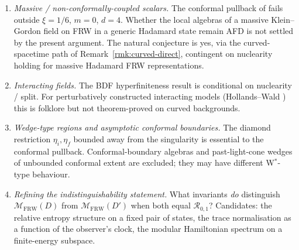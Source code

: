 \documentclass[11pt]{article}
\theoremstyle{definition}
\newcommand{\MM}{\mathcal{M}}
\newcommand{\RR}{\mathcal{R}}
\newcommand{\FRW}{\mathrm{FRW}}
\begin{document}
\begin{enumerate}
\item \emph{Massive / non-conformally-coupled scalars.} The conformal
pullback of \cite{FrwNote2026} fails outside $\xi=1/6$, $m=0$, $d=4$.
Whether the local algebras of a massive Klein--Gordon field on FRW in a
generic Hadamard state remain AFD is not settled by the present argument.
The natural conjecture is yes, via the curved-spacetime path of
Remark~\ref{rmk:curved-direct}, contingent on nuclearity holding for
massive Hadamard FRW representations.

\item \emph{Interacting fields.} The BDF \cite{BDF1987} hyperfiniteness
result is conditional on nuclearity / split. For perturbatively
constructed interacting models (Hollands--Wald \cite{HollandsWald2001})
this is folklore but not theorem-proved on curved backgrounds.

\item \emph{Wedge-type regions and asymptotic conformal boundaries.}
The diamond restriction $\eta_i, \eta_f$ bounded away from the singularity
is essential to the conformal pullback. Conformal-boundary algebras and
past-light-cone wedges of unbounded conformal extent are excluded; they
may have different W$^*$-type behaviour.

\item \emph{Refining the indistinguishability statement.} What invariants
\emph{do} distinguish $\MM_\FRW(D)$ from $\MM_\FRW(D')$ when both equal
$\RR_{0,1}$? Candidates: the relative entropy structure on a fixed pair of
states, the trace normalisation as a function of the observer's clock,
the modular Hamiltonian spectrum on a finite-energy subspace.
\end{enumerate}
\end{document}
